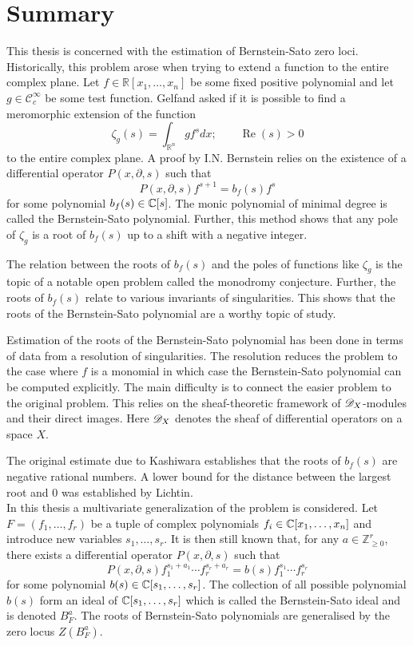 \chapter*{Summary}\label{ch: Summary} %
This thesis is concerned with the estimation of Bernstein-Sato zero loci.\\

\noindent
Historically, this problem arose when trying to extend a function to the entire complex plane.
Let $f\in \mathbb{R}[x_1,\ldots,x_n]$ be some fixed positive polynomial and let $g \in \mathcal{C}_c^\infty$ be some test function.
Gelfand asked if it is possible to find a meromorphic extension of the function
$$\zeta_g(s) = \int_{\mathbb{R}^n} g f^s dx; \qquad \operatorname{Re}(s)>0 $$
to the entire complex plane.
A proof by I.N. Bernstein relies on the existence of a differential operator $P(x,\partial, s)$ such that
$$P(x,\partial,s) f^{s+1} = b_f(s) f^s$$
for some polynomial $b_f(s)\in \mathbb{C}[s]$.
The monic polynomial of minimal degree is called the Bernstein-Sato polynomial.
Further, this method shows that any pole of $\zeta_g$ is a root of $b_f(s)$ up to a shift with a negative integer.

The relation between the roots of $b_f(s)$ and the poles of functions like $\zeta_g$ is the topic of a notable open problem called the monodromy conjecture.
Further, the roots of $b_f(s)$ relate to various invariants of singularities.
This shows that the roots of the Bernstein-Sato polynomial are a worthy topic of study.

Estimation of the roots of the Bernstein-Sato polynomial has been done in terms of data from a resolution of singularities.
The resolution reduces the problem to the case where $f$ is a monomial in which case the Bernstein-Sato polynomial can be computed explicitly.
The main difficulty is to connect the easier problem to the original problem.
This relies on the sheaf-theoretic framework of $\mathscr{D}_X$-modules and their direct images.
Here $\mathscr{D}_X$ denotes the sheaf of differential operators on a space $X$.

The original estimate due to Kashiwara establishes that the roots of $b_f(s)$ are negative rational numbers.
A lower bound for the distance between the largest root and $0$ was established by Lichtin.
\\

\noindent
In this thesis a multivariate generalization of the problem is considered.
Let $F= (f_1,\ldots,f_r)$ be a tuple of complex polynomials $f_i \in \mathbb{C}[x_1,\ldots,x_n]$ and introduce new variables $s_1,\ldots, s_r$.
It is then still known that, for any $a \in \mathbb{Z}_{\geq 0}^r$, there exists a differential operator $P(x,\partial, s)$ such that
$$P(x,\partial,s) f_1^{s_1 + a_1}\cdots f_r^{s_r + a_r} = b(s)f_1^{s_1}\cdots f_r^{s_r}$$
for some polynomial $b(s) \in \mathbb{C}[s_1,\ldots, s_r]$.
The collection of all possible polynomial $b(s)$ form an ideal of $\mathbb{C}[s_1,\ldots,s_r]$ which is called the Bernstein-Sato ideal and is denoted $B_{F}^a$.
The roots of Bernstein-Sato polynomials are generalised by the zero locus $Z(B_F^a)$.

